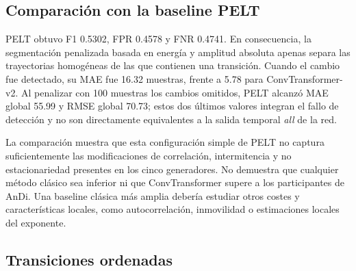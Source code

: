\documentclass[a4paper,12pt]{article}
\begin{document}
\subsection{Comparación con la baseline PELT}
\label{sec:pelt-results}

\begin{table}[htbp]
\centering
\footnotesize
\setlength{\tabcolsep}{3.5pt}
\caption{Comparación sobre el test completo de $L=100$. ConvTransformer-v2 corresponde a la ejecución principal; PELT es una baseline sin entrenamiento supervisado. Los errores temporales se restringen a verdaderos positivos.}
\label{tab:convtransformer-pelt}
\end{table}

PELT obtuvo F1 0.5302, FPR 0.4578 y FNR 0.4741. En consecuencia, la segmentación penalizada basada en energía y amplitud absoluta apenas separa las trayectorias homogéneas de las que contienen una transición. Cuando el cambio fue detectado, su MAE fue 16.32 muestras, frente a 5.78 para ConvTransformer-v2. Al penalizar con 100 muestras los cambios omitidos, PELT alcanzó MAE global 55.99 y RMSE global 70.73; estos dos últimos valores integran el fallo de detección y no son directamente equivalentes a la salida temporal \emph{all} de la red.

La comparación muestra que esta configuración simple de PELT no captura suficientemente las modificaciones de correlación, intermitencia y no estacionariedad presentes en los cinco generadores. No demuestra que cualquier método clásico sea inferior ni que ConvTransformer supere a los participantes de AnDi. Una baseline clásica más amplia debería estudiar otros costes y características locales, como autocorrelación, inmovilidad o estimaciones locales del exponente.

\subsection{Transiciones ordenadas}
\end{document}
